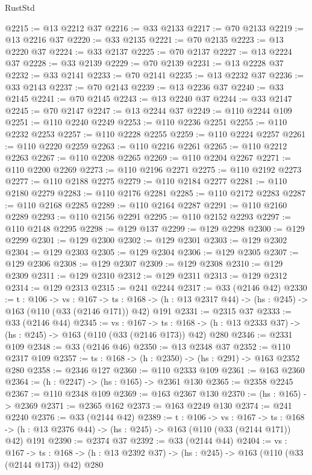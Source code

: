 \begin{lexlean}{RustStd}
\begin{coremodule}
@2215 := @13 @2212 @37
@2216 := @33 @2133
@2217 := @70 @2133
@2219 := @13 @2216 @37
@2220 := @33 @2135
@2221 := @70 @2135
@2223 := @13 @2220 @37
@2224 := @33 @2137
@2225 := @70 @2137
@2227 := @13 @2224 @37
@2228 := @33 @2139
@2229 := @70 @2139
@2231 := @13 @2228 @37
@2232 := @33 @2141
@2233 := @70 @2141
@2235 := @13 @2232 @37
@2236 := @33 @2143
@2237 := @70 @2143
@2239 := @13 @2236 @37
@2240 := @33 @2145
@2241 := @70 @2145
@2243 := @13 @2240 @37
@2244 := @33 @2147
@2245 := @70 @2147
@2247 := @13 @2244 @37
@2249 := @110 @2244 @109
@2251 := @110 @2240 @2249
@2253 := @110 @2236 @2251
@2255 := @110 @2232 @2253
@2257 := @110 @2228 @2255
@2259 := @110 @2224 @2257
@2261 := @110 @2220 @2259
@2263 := @110 @2216 @2261
@2265 := @110 @2212 @2263
@2267 := @110 @2208 @2265
@2269 := @110 @2204 @2267
@2271 := @110 @2200 @2269
@2273 := @110 @2196 @2271
@2275 := @110 @2192 @2273
@2277 := @110 @2188 @2275
@2279 := @110 @2184 @2277
@2281 := @110 @2180 @2279
@2283 := @110 @2176 @2281
@2285 := @110 @2172 @2283
@2287 := @110 @2168 @2285
@2289 := @110 @2164 @2287
@2291 := @110 @2160 @2289
@2293 := @110 @2156 @2291
@2295 := @110 @2152 @2293
@2297 := @110 @2148 @2295
@2298 := @129 @137
@2299 := @129 @2298
@2300 := @129 @2299
@2301 := @129 @2300
@2302 := @129 @2301
@2303 := @129 @2302
@2304 := @129 @2303
@2305 := @129 @2304
@2306 := @129 @2305
@2307 := @129 @2306
@2308 := @129 @2307
@2309 := @129 @2308
@2310 := @129 @2309
@2311 := @129 @2310
@2312 := @129 @2311
@2313 := @129 @2312
@2314 := @129 @2313
@2315 := @241 @2244
@2317 := @33 (@2146 @42)
@2330 := {t : @106} ->
  {vs : @167} ->
  {ts : @168} -> (h : @13 @2317 @44) -> (hs : @245) -> @163 (@110 (@33 (@2146 @171)) @42) @191
@2331 := @2315 @37
@2333 := @33 (@2146 @44)
@2345 := {vs : @167} ->
  {ts : @168} -> (h : @13 @2333 @37) -> (hs : @245) -> @163 (@110 (@33 (@2146 @173)) @42) @280
@2346 := @2331 @109
@2348 := @33 (@2146 @46)
@2350 := @13 @2348 @37
@2352 := @110 @2317 @109
@2357 := {ts : @168} -> (h : @2350) -> (hs : @291) -> @163 @2352 @280
@2358 := @2346 @127
@2360 := @110 @2333 @109
@2361 := @163 @2360
@2364 := (h : @2247) -> (hs : @165) -> @2361 @130
@2365 := @2358 @2245
@2367 := @110 @2348 @109
@2369 := @163 @2367 @130
@2370 := (hs : @165) -> @2369
@2371 := @2365 @162
@2373 := @163 @2249 @130
@2374 := @241 @2240
@2376 := @33 (@2144 @42)
@2389 := {t : @106} ->
  {vs : @167} ->
  {ts : @168} -> (h : @13 @2376 @44) -> (hs : @245) -> @163 (@110 (@33 (@2144 @171)) @42) @191
@2390 := @2374 @37
@2392 := @33 (@2144 @44)
@2404 := {vs : @167} ->
  {ts : @168} -> (h : @13 @2392 @37) -> (hs : @245) -> @163 (@110 (@33 (@2144 @173)) @42) @280

\end{coremodule}
\end{lexlean}
